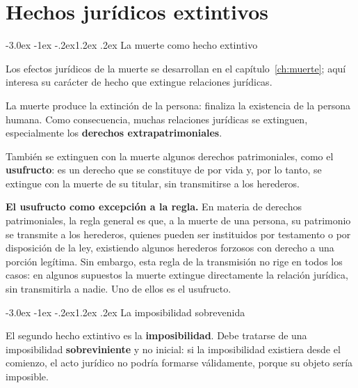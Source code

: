 \documentclass[12pt,oneside]{book}
\makeatletter
\renewcommand\section{\@startsection{section}{1}{\z@}%
  {-3.0ex \@plus -1ex \@minus -.2ex}{1.2ex \@plus .2ex}%
  {\normalfont\large\bfseries\color{acento}}}
\makeatother
\begin{document}
\chapter{Hechos jurídicos extintivos}

\section{La muerte como hecho extintivo}

Los efectos jurídicos de la muerte se desarrollan en el capítulo~\ref{ch:muerte}; aquí interesa su carácter de hecho que extingue relaciones jurídicas.


La muerte produce la extinción de la persona: finaliza la existencia de la persona humana. Como consecuencia, muchas relaciones jurídicas se extinguen, especialmente los \textbf{derechos extrapatrimoniales}.

También se extinguen con la muerte algunos derechos patrimoniales, como el \textbf{usufructo}: es un derecho que se constituye de por vida y, por lo tanto, se extingue con la muerte de su titular, sin transmitirse a los herederos.

\begin{importante}
\textbf{El usufructo como excepción a la regla.} En materia de derechos patrimoniales, la regla general es que, a la muerte de una persona, su patrimonio se transmite a los herederos, quienes pueden ser instituidos por testamento o por disposición de la ley, existiendo algunos herederos forzosos con derecho a una porción legítima. Sin embargo, esta regla de la transmisión no rige en todos los casos: en algunos supuestos la muerte extingue directamente la relación jurídica, sin transmitirla a nadie. Uno de ellos es el usufructo.
\end{importante}

\section{La imposibilidad sobrevenida}

El segundo hecho extintivo es la \textbf{imposibilidad}. Debe tratarse de una imposibilidad \textbf{sobreviniente} y no inicial: si la imposibilidad existiera desde el comienzo, el acto jurídico no podría formarse válidamente, porque su objeto sería imposible.
\end{document}
